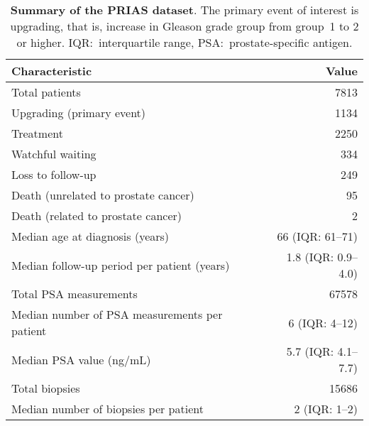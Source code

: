 \begin{table}
\small\sf\centering
\caption{\textbf{Summary of the PRIAS dataset}. The primary event of interest is upgrading, that is, increase in Gleason grade group from group~1 to 2 or higher. IQR:~interquartile range, PSA:~prostate-specific antigen.}
\label{table:prias_summary}
\begin{tabular}{lr}
\toprule
\textbf{Characteristic} & \textbf{Value}\\
\midrule
Total patients & 7813\\
Upgrading (primary event) & 1134\\
Treatment & 2250\\
Watchful waiting & 334\\
Loss to follow-up & 249\\
Death (unrelated to prostate cancer) & 95\\
Death (related to prostate cancer) & 2\\
\midrule
Median age at diagnosis (years) & 66 (IQR: 61--71)\\
Median follow-up period per patient (years) &  1.8 (IQR: 0.9--4.0)\\
Total PSA measurements & 67578\\
Median number of PSA measurements per patient &  6 (IQR: 4--12)\\
Median PSA value (ng/mL) & 5.7 (IQR: 4.1--7.7)\\
Total biopsies & 15686\\
Median number of biopsies per patient &  2 (IQR: 1--2)\\
\bottomrule
\end{tabular}
\end{table}
